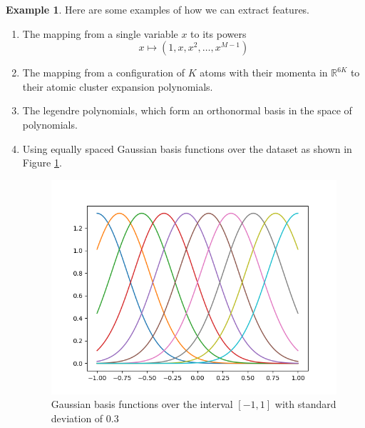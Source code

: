 \documentclass{article}
\theoremstyle{definition}
\newtheorem{example}{Example}[section]
\begin{document}
    \begin{example}
    Here are some examples of how we can extract features. 
    \begin{enumerate}
        \item The mapping from a single variable $x$ to its powers 
        \[x \mapsto (1, x, x^2, \ldots, x^{M-1})\]

        \item The mapping from a configuration of $K$ atoms with their momenta in $\mathbb{R}^{6K}$ to their atomic cluster expansion polynomials. 

        \item The legendre polynomials, which form an orthonormal basis in the space of polynomials. 

        \item Using equally spaced Gaussian basis functions over the dataset as shown in Figure \ref{fig:Gaussian_basis_functions}. 
        \begin{figure}
            \centering
            \includegraphics[scale=0.5]{Section_2/Gaussian_basis_functions.png}
            \caption{Gaussian basis functions over the interval $[-1, 1]$ with standard deviation of $0.3$}
            \label{fig:Gaussian_basis_functions}
        \end{figure}
    \end{enumerate}
    \end{example}
\end{document}

